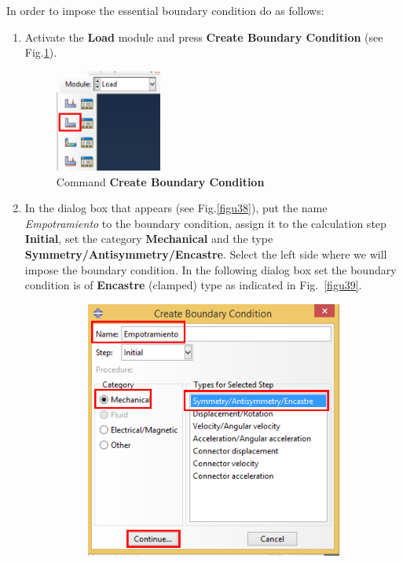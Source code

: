 In order to impose the essential boundary condition do as
follows:
\begin{enumerate}
\item Activate the \textbf{Load} module and press \textbf{Create
    Boundary Condition} (see Fig.\ref{figu37}).
  \begin{figure}[!h]
    \centering
    \includegraphics[width=0.33\textwidth]{./body/images/imagen37.pdf}
    \caption{Command \textbf{Create Boundary Condition}}
    \label{figu37}
  \end{figure}
\item In the dialog box that appears (see Fig.\ref{figu38}), put the
  name \textit{Empotramiento} to the boundary condition, assign it to the
  calculation step \textbf{Initial}, set the category
  \textbf{Mechanical} and the type
  \textbf{Symmetry/Antisymmetry/Encastre}. Select the left side where
  we will impose the boundary condition. In the following dialog box set
   the boundary condition is of \textbf{Encastre} (clamped) type
  as indicated in Fig.~\ref{figu39}.
  \begin{figure}[H]
    \centering
    \begin{subfigure}{0.45\textwidth}
      \includegraphics[width=\textwidth]{./body/images/imagen38.pdf}

\end{subfigure}
\end{figure}
\end{enumerate}
